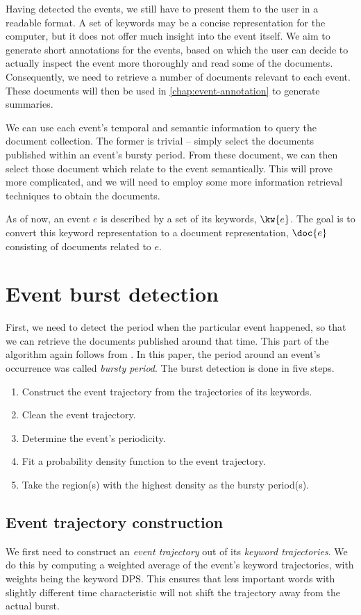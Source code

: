 Having detected the events, we still have to present them to the user in a readable format. A set of keywords may be a concise representation for the computer, but it does not offer much insight into the event itself. We aim to generate short annotations for the events, based on which the user can decide to actually inspect the event more thoroughly and read some of the documents. Consequently, we need to retrieve a number of documents relevant to each event. These documents will then be used in \autoref{chap:event-annotation} to generate summaries.

We can use each event's temporal and semantic information to query the document collection. The former is trivial -- simply select the documents published within an event's bursty period. From these document, we can then select those document which relate to the event semantically. This will prove more complicated, and we will need to employ some more information retrieval techniques to obtain the documents.

As of now, an event $e$ is described by a set of its keywords, $\kw{e}$. The goal is to convert this keyword representation to a document representation, $\doc{e}$ consisting of documents related to $e$.

\section{Event burst detection}
First, we need to detect the period when the particular event happened, so that we can retrieve the documents published around that time. This part of the algorithm again follows from \cite{event-detection}. In this paper, the period around an event's occurrence was called \textit{bursty period}. The burst detection is done in five steps.

\begin{enumerate}
	\item Construct the event trajectory from the trajectories of its keywords.
	\item Clean the event trajectory.
	\item Determine the event's periodicity.
	\item Fit a probability density function to the event trajectory.
	\item Take the region(s) with the highest density as the bursty period(s).
\end{enumerate}


\subsection{Event trajectory construction}
We first need to construct an \textit{event trajectory} out of its \textit{keyword trajectories}. We do this by computing a weighted average of the event's keyword trajectories, with weights being the keyword DPS. This ensures that less important words with slightly different time characteristic will not shift the trajectory away from the actual burst.


